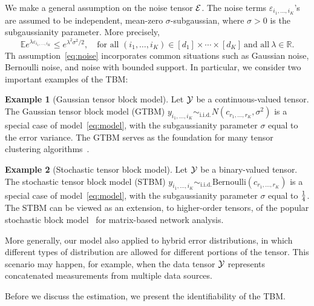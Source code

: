 \documentclass[11pt]{article}
\theoremstyle{plain}
\theoremstyle{definition}
\newtheorem{exam}{Example}
\begin{document}
We make a general assumption on the noise tensor $\mathcal{E}$. The noise terms $\varepsilon_{i_1,\ldots,i_K}$'s are assumed to be independent, mean-zero $\sigma$-subgaussian, where $\sigma>0$ is the subgaussianity parameter. More precisely, 
\begin{equation}\label{eq:noise}
\mathbb{E}e^{\lambda \varepsilon_{i_1,\ldots,i_K}}\leq e^{\lambda^2\sigma^2/2},\quad \text{for all } (i_1,\ldots,i_K)\in[d_1]\times\cdots\times[d_K] \ \text{and all}\ \lambda\in\mathbb{R}.
\end{equation}
Th assumption~\eqref{eq:noise} incorporates common situations such as Gaussian noise, Bernoulli noise, and noise with bounded support. In particular, we consider two important examples of the TBM:

\begin{exam}[Gaussian tensor block model]
Let $\mathcal{Y}$ be a continuous-valued tensor. The Gaussian tensor block model (GTBM) $y_{i_1,\ldots,i_K}  \sim_{\text{i.i.d.}} N(c_{r_1,\ldots,r_K},\sigma^2)$ is a special case of model~\eqref{eq:model}, with the subgaussianity parameter $\sigma$ equal to the error variance. The GTBM serves as the foundation for many tensor clustering algorithms~\cite{jegelka2009approximation,wang2017three,chi2018provable}. 
\end{exam}

\begin{exam}[Stochastic tensor block model]
Let $\mathcal{Y}$ be a binary-valued tensor. The stochastic tensor block model (STBM) $y_{i_1,\ldots,i_K}  \sim_{\text{i.i.d.}} \text{Bernoulli}(c_{r_1,\ldots,r_K})$ is a special case of model~\eqref{eq:model}, with the subgaussianity parameter $\sigma$ equal to ${1\over 4}$. The STBM can be viewed as an extension, to higher-order tensors, of the popular stochastic block model~\cite{gao2018minimax,bickel2009nonparametric,lei2015consistency} for matrix-based network analysis.
\end{exam}

More generally, our model also applied to hybrid error distributions, in which different types of distribution are allowed for different portions of the tensor. This scenario may happen, for example, when the data tensor $\mathcal{Y}$ represents concatenated measurements from multiple data sources. 

Before we discuss the estimation, we present the identifiability of the TBM. 
\end{document}
